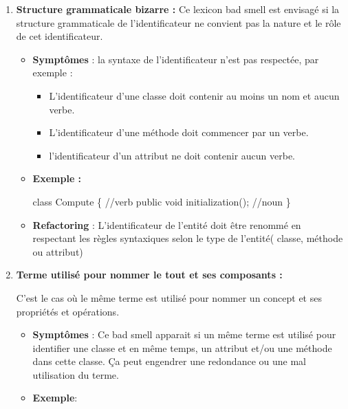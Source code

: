 \begin{enumerate}
    \item \textbf {Structure grammaticale bizarre :}
Ce lexicon bad smell est envisagé si la structure grammaticale de l’identificateur ne convient pas la nature et le rôle  de cet identificateur.
\begin{itemize}
    \item \textbf{Symptômes} : la syntaxe de l’identificateur n’est pas respectée, par exemple :
    \begin{itemize}
        \item  L’identificateur d’une classe doit contenir au moins un nom et aucun verbe.
        \item  L’identificateur d’une méthode doit commencer par un verbe.
        \item  l’identificateur d’un attribut ne doit contenir aucun verbe.
  \end{itemize}
\item \textbf{Exemple :}

\begin{framed}
{\selectfont
class Compute \{ //verb
\newline
public void initialization(); //noun
\newline
\}
}
\end{framed}

 
   
\item \textbf{Refactoring }:
L’identificateur de l’entité doit être renommé en respectant les règles syntaxiques selon le type de l’entité( classe, méthode ou attribut)
\end{itemize}  
\item \textbf {Terme utilisé pour nommer le tout et ses composants :}

C'est le cas où le même terme est utilisé pour nommer un concept et ses propriétés et opérations.
\begin{itemize}
\item \textbf{Symptômes} :
Ce bad smell apparait si un même terme est utilisé pour identifier une classe et en même temps, un attribut et/ou une méthode dans cette classe.
Ça peut engendrer une redondance ou une mal utilisation du terme.
\item \textbf{Exemple}:



\end{itemize}
\end{enumerate}
